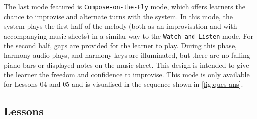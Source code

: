 \documentclass{vgtc}                          %
\begin{document}
\par %
The last mode featured is \texttt{Compose-on-the-Fly} mode, which offers learners the chance to improvise and alternate turns with the system. In this mode, the system plays the first half of the melody (both as an improvisation and with accompanying music sheets) in a similar way to the \texttt{Watch-and-Listen} mode. For the second half, gaps are provided for the learner to play. During this phase, harmony audio plays, and harmony keys are illuminated, but there are no falling piano bars or displayed notes on the music sheet. This design is intended to give the learner the freedom and confidence to improvise. This mode is only available for Lessons 04 and 05 and is visualised in the sequence shown in \autoref{fig:ques-ans}.


\subsection{Lessons}
\label{subsec: lessons}
\end{document}
